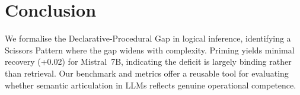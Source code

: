 \documentclass[11pt]{article}
\begin{document}
\section{Conclusion}

We formalise the Declarative-Procedural Gap in logical inference,
identifying a Scissors Pattern where the gap widens with complexity.
Priming yields minimal recovery (+0.02) for Mistral~7B, indicating the deficit is largely binding rather than retrieval.
Our benchmark and metrics offer a reusable tool for evaluating
whether semantic articulation in LLMs reflects genuine
operational competence.



\end{document}

